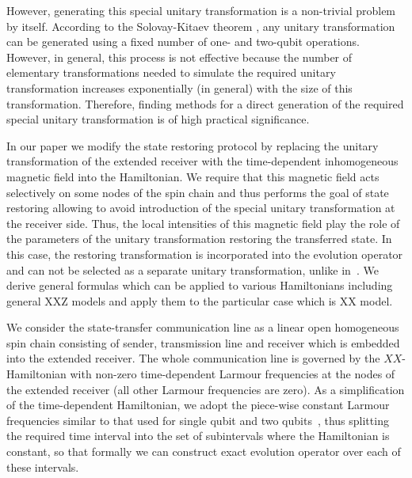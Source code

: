 \documentclass[pra,preprint,showpacs]{revtex4-1}
\begin{document}
However, generating this special unitary transformation is a non-trivial problem by itself. According to the Solovay-Kitaev theorem \cite{NCh}, any unitary transformation can be generated using a fixed number of one- and two-qubit operations. However, in general, this process is not effective because the number of elementary transformations needed to simulate the required unitary transformation increases exponentially (in general) with the size of this transformation. Therefore, finding methods for a direct generation of the required special unitary transformation is of high practical significance.

In our paper we modify the state restoring protocol by { replacing the unitary transformation of the extended receiver with} the time-dependent inhomogeneous magnetic field  into the Hamiltonian. We require that this magnetic field acts selectively on some nodes of the spin chain and thus performs the goal of state restoring allowing to avoid introduction of the special unitary  transformation at the receiver side. Thus, the local intensities of this magnetic field play the role of the parameters of the unitary transformation restoring the transferred state. In this case, the restoring transformation is incorporated into the evolution operator and can not be selected as a separate unitary transformation, unlike in~\cite{BFLP_2022}. {We derive general formulas which can be applied to various Hamiltonians including general XXZ models and apply them to the particular case which is XX model.}

We consider the state-transfer communication line as a linear open homogeneous spin chain consisting of sender, transmission line and receiver which is embedded into the extended receiver.  The whole communication line is governed by the $XX$-Hamiltonian with non-zero time-dependent  Larmour frequencies at the nodes of the extended receiver (all other Larmour frequencies are zero). As a simplification of the time-dependent Hamiltonian, we adopt the piece-wise constant Larmour frequencies similar to that used for single qubit and two qubits~\cite{PP_2023,MP_2023},  thus splitting  the required time interval  into  the set of subintervals where the Hamiltonian is constant, so that formally we can construct exact evolution operator over each of these intervals.
\end{document}

